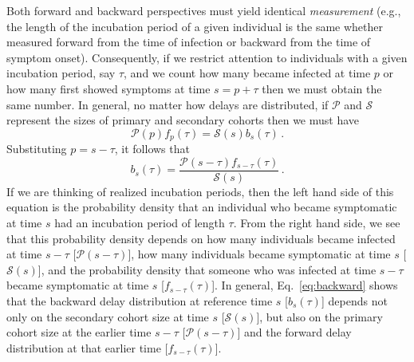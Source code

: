 \documentclass[12pt]{article}
\newcommand{\psymp}{\ensuremath{p}} %
\newcommand{\ssymp}{\ensuremath{s}} %
\newcommand{\psize}{{\mathcal P}} %
\newcommand{\ssize}{{\mathcal S}} %
\begin{document}
Both forward and backward perspectives
must yield identical \emph{measurement} (e.g., the length of the incubation
period of a given individual is the same whether measured forward from
the time of infection or backward from the time of symptom onset).
Consequently, if we restrict attention to individuals with a given
incubation period, say $\tau$, and we count how many became infected at time $\psymp$
or how many first showed symptoms at time $\ssymp=\psymp+\tau$ then we must obtain
the same number. In general, no matter how delays are distributed, if
$\mathcal P$ and $\mathcal S$ represent the sizes of primary and
secondary cohorts then we must have
\begin{equation}
\psize(\psymp) f_\psymp(\tau) = \ssize(\ssymp) b_\ssymp(\tau) \,.
\label{eq:match}
\end{equation}
Substituting $\psymp=\ssymp-\tau$, it follows that
\begin{equation}
b_\ssymp(\tau)= \frac{\psize(\ssymp-\tau) f_{\ssymp-\tau} (\tau)}{\ssize(\ssymp)}\,.
\label{eq:backward}
\end{equation}
If we are thinking of realized incubation periods, then the left hand side of
this equation is the probability density that an individual
who became symptomatic at time $\ssymp$ had an incubation period of
length $\tau$. From the right hand side, we see that this probability
density depends on how many individuals became infected at time
$\ssymp-\tau$ [$\psize(\ssymp-\tau)$], how many individuals became
symptomatic at time $\ssymp$ [$\ssize(\ssymp)$], and the probability density
that someone who was infected at time $\ssymp-\tau$ became symptomatic at
time $\ssymp$ [$f_{\ssymp-\tau}(\tau)$]. In general, Eq.~\eqref{eq:backward}
shows that the backward delay distribution at reference time $\ssymp$
[$b_\ssymp(\tau)$] depends not only on the secondary cohort size at time
$\ssymp$ [$\ssize(\ssymp)$], but also on the primary cohort size at the
earlier time $\ssymp-\tau$ [$\psize(\ssymp-\tau)$] and the forward delay
distribution at that earlier time [$f_{\ssymp-\tau}(\tau)$].
\end{document}
